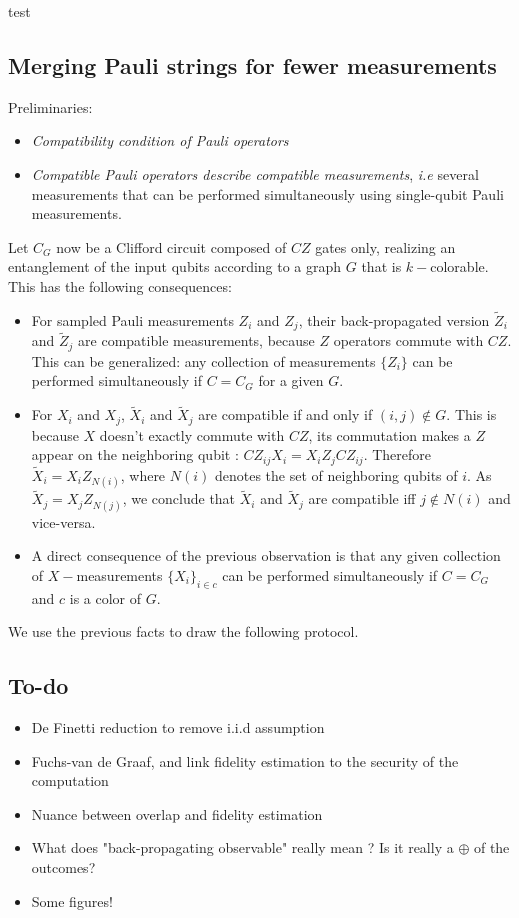 \documentclass[a4paper,unpublished,onecolumn,11pt]{quantumarticle}
\begin{document}
\begin{theorem}
    test
\end{theorem}
\subsection{Merging Pauli strings for fewer measurements}
Preliminaries: 
\begin{itemize}
    \item \textit{Compatibility condition of Pauli operators}
    \item \textit{Compatible Pauli operators describe compatible measurements}, \textit{i.e} several measurements that can be performed simultaneously using single-qubit Pauli measurements.
\end{itemize}

Let $C_G$ now be a Clifford circuit composed of $CZ$ gates only, realizing an entanglement of the input qubits according to a graph $G$ that is $k-$colorable. This has the following consequences:
\begin{itemize}
    \item For sampled Pauli measurements $Z_i$ and $Z_j$, their back-propagated version $\tilde Z_i$ and $\tilde Z_j$ are compatible measurements, because $Z$ operators commute with $CZ$. This can be generalized: any collection of measurements $\{Z_i\}$ can be performed simultaneously if $C=C_G$ for a given $G$. 

    \item For $X_i$ and $X_j$, $\tilde X_i$ and $\tilde X_j$ are compatible if and only if $(i,j)\notin G$. This is because $X$ doesn't exactly commute with $CZ$, its commutation makes a $Z$ appear on the neighboring qubit : $CZ_{ij} X_i = X_i Z_j CZ_{ij}$. Therefore $\tilde X_i = X_i Z_{N(i)}$, where $N(i)$ denotes the set of neighboring qubits of $i$. As $\tilde X_j = X_j Z_{N(j)}$, we conclude that $\tilde X_i$ and $\tilde X_j$ are compatible iff $j\notin N(i)$ and vice-versa.
    \item A direct consequence of the previous observation is that any given collection of $X-$measurements $\{X_i\}_{i\in c}$ can be performed simultaneously if $C = C_G$ and $c$ is a color of $G$.
\end{itemize}

We use the previous facts to draw the following protocol.

\subsection{To-do}
\begin{itemize}
    \item De Finetti reduction to remove i.i.d assumption
    \item Fuchs-van de Graaf, and link fidelity estimation to the security of the computation
    \item Nuance between overlap and fidelity estimation
    \item What does "back-propagating observable" really mean ? Is it really a $\oplus$ of the outcomes?
    \item Some figures!
\end{itemize}
\end{document}
